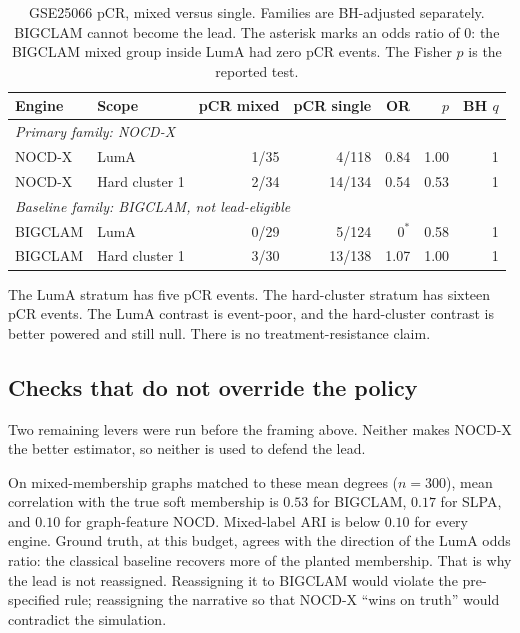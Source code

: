 \documentclass[11pt,a4paper]{article}
\begin{document}
\begin{table}[htbp]
\centering
\caption{GSE25066 pCR, mixed versus single. Families are BH-adjusted separately. BIGCLAM cannot become the lead. The asterisk marks an odds ratio of 0: the BIGCLAM mixed group inside LumA had zero pCR events. The Fisher $p$ is the reported test.}
\label{tab:pcr}
\begin{tabular}{llrrrrr}
\toprule
Engine & Scope & pCR mixed & pCR single & OR & $p$ & BH $q$ \\
\midrule
\multicolumn{7}{l}{\emph{Primary family: NOCD-X}} \\
NOCD-X & LumA & 1/35 & 4/118 & 0.84 & 1.00 & 1 \\
NOCD-X & Hard cluster 1 & 2/34 & 14/134 & 0.54 & 0.53 & 1 \\
\midrule
\multicolumn{7}{l}{\emph{Baseline family: BIGCLAM, not lead-eligible}} \\
BIGCLAM & LumA & 0/29 & 5/124 & $0^{\ast}$ & 0.58 & 1 \\
BIGCLAM & Hard cluster 1 & 3/30 & 13/138 & 1.07 & 1.00 & 1 \\
\bottomrule
\end{tabular}
\end{table}

The LumA stratum has five pCR events. The hard-cluster stratum has sixteen pCR events. The LumA contrast is event-poor, and the hard-cluster contrast is better powered and still null. There is no treatment-resistance claim.

\subsection{Checks that do not override the policy}
Two remaining levers were run before the framing above. Neither makes NOCD-X the better estimator, so neither is used to defend the lead.

On mixed-membership graphs matched to these mean degrees ($n=300$), mean correlation with the true soft membership is $0.53$ for BIGCLAM, $0.17$ for SLPA, and $0.10$ for graph-feature NOCD. Mixed-label ARI is below $0.10$ for every engine. Ground truth, at this budget, agrees with the direction of the LumA odds ratio: the classical baseline recovers more of the planted membership. That is why the lead is not reassigned. Reassigning it to BIGCLAM would violate the pre-specified rule; reassigning the narrative so that NOCD-X ``wins on truth'' would contradict the simulation.
\end{document}
